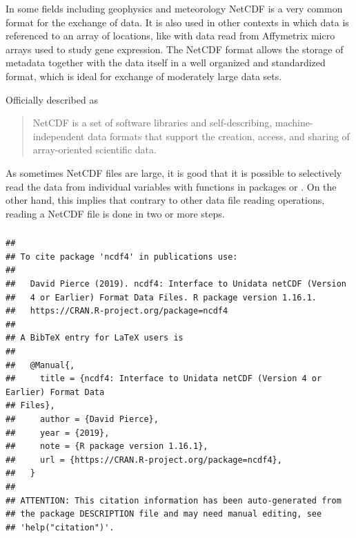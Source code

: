 \documentclass[krantz2]{krantz}\usepackage{knitr}%
\begin{document}
In some fields including geophysics and meteorology NetCDF is a very common format for the exchange of data. It is also used in other contexts in which data is referenced to an array of locations, like with data read from Affymetrix micro arrays used to study gene expression. The NetCDF format allows the storage of metadata together with the data itself in a well organized and standardized format, which is ideal for exchange of moderately large data sets.

Officially described as
\begin{quote}
NetCDF is a set of software libraries and self-describing, machine-independent data formats that support the creation, access, and sharing of array-oriented scientific data.
\end{quote}

As sometimes NetCDF files are large, it is good that it is possible to selectively read the data from individual variables with functions in packages  or . On the other hand, this implies that contrary to other data file reading operations, reading a NetCDF file is done in two or more steps.

\subsubsection[ncdf4]{}

\begin{knitrout}\footnotesize
{}\color{fgcolor}\begin{kframe}
\begin{alltt}
\hlstd{(} \hlstd{=} \hlstd{)}
\end{alltt}
\begin{verbatim}
## 
## To cite package 'ncdf4' in publications use:
## 
##   David Pierce (2019). ncdf4: Interface to Unidata netCDF (Version
##   4 or Earlier) Format Data Files. R package version 1.16.1.
##   https://CRAN.R-project.org/package=ncdf4
## 
## A BibTeX entry for LaTeX users is
## 
##   @Manual{,
##     title = {ncdf4: Interface to Unidata netCDF (Version 4 or Earlier) Format Data
## Files},
##     author = {David Pierce},
##     year = {2019},
##     note = {R package version 1.16.1},
##     url = {https://CRAN.R-project.org/package=ncdf4},
##   }
## 
## ATTENTION: This citation information has been auto-generated from
## the package DESCRIPTION file and may need manual editing, see
## 'help("citation")'.
\end{verbatim}
\end{kframe}
\end{knitrout}
\end{document}
